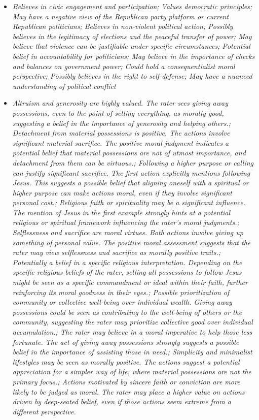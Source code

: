\documentclass[11pt]{article}
\newcommand{\profiletext}[1]{\textit{#1}}
\begin{document}
\begin{itemize}
\item \profiletext{Believes in civic engagement and participation; Values democratic principles; May have a negative view of the Republican party platform or current Republican politicians; Believes in non-violent political action; Possibly believes in the legitimacy of elections and the peaceful transfer of power; May believe that violence can be justifiable under specific circumstances; Potential belief in accountability for politicians; May believe in the importance of checks and balances on government power; Could hold a consequentialist moral perspective; Possibly believes in the right to self-defense; May have a nuanced understanding of political conflict}
\item \profiletext{Altruism and generosity are highly valued.  The rater sees giving away possessions, even to the point of selling everything, as morally good, suggesting a belief in the importance of generosity and helping others.; Detachment from material possessions is positive. The actions involve significant material sacrifice. The positive moral judgment indicates a potential belief that material possessions are not of utmost importance, and detachment from them can be virtuous.; Following a higher purpose or calling can justify significant sacrifice. The first action explicitly mentions following Jesus. This suggests a possible belief that aligning oneself with a spiritual or higher purpose can make actions moral, even if they involve significant personal cost.; Religious faith or spirituality may be a significant influence. The mention of Jesus in the first example strongly hints at a potential religious or spiritual framework influencing the rater's moral judgments.; Selflessness and sacrifice are moral virtues. Both actions involve giving up something of personal value.  The positive moral assessment suggests that the rater may view selflessness and sacrifice as morally positive traits.; Potentially a belief in a specific religious interpretation.  Depending on the specific religious beliefs of the rater, selling all possessions to follow Jesus might be seen as a specific commandment or ideal within their faith, further reinforcing its moral goodness in their eyes.; Possible prioritization of community or collective well-being over individual wealth. Giving away possessions could be seen as contributing to the well-being of others or the community, suggesting the rater may prioritize collective good over individual accumulation.; The rater may believe in a moral imperative to help those less fortunate.  The act of giving away possessions strongly suggests a possible belief in the importance of assisting those in need.; Simplicity and minimalist lifestyles may be seen as morally positive. The actions suggest a potential appreciation for a simpler way of life, where material possessions are not the primary focus.; Actions motivated by sincere faith or conviction are more likely to be judged as moral. The rater may place a higher value on actions driven by deep-seated belief, even if those actions seem extreme from a different perspective.}

\end{itemize}
\end{document}
